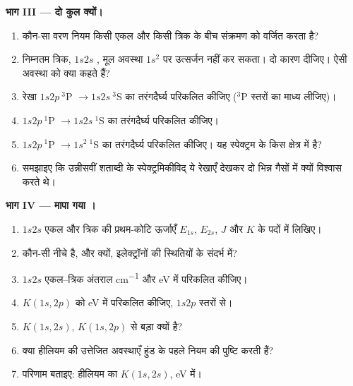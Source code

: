 \begin{problem}
\medskip\noindent\textbf{भाग III --- दो कुल क्यों।}
\begin{enumerate}[resume]
  \item कौन-सा वरण नियम किसी एकल और किसी
        त्रिक के बीच संक्रमण को वर्जित करता है?
  \item निम्नतम त्रिक, $1s2s$ , मूल
        अवस्था $1s^2$  पर उत्सर्जन नहीं कर सकता। दो कारण दीजिए। ऐसी अवस्था
        को क्या कहते हैं?
  \item रेखा $1s2p\ {}^3$P $\to 1s2s\ {}^3$S का तरंगदैर्घ्य परिकलित कीजिए
        (${}^3$P स्तरों का माध्य लीजिए)।
  \item $1s2p\ {}^1$P $\to 1s2s\ {}^1$S का तरंगदैर्घ्य परिकलित कीजिए।
  \item $1s2p\ {}^1$P $\to 1s^2\ {}^1$S का तरंगदैर्घ्य परिकलित कीजिए। यह स्पेक्ट्रम के
        किस क्षेत्र में है?
  \item समझाइए कि उन्नीसवीं शताब्दी के स्पेक्ट्रमिकीविद् ये रेखाएँ देखकर
        दो भिन्न गैसों में क्यों विश्वास करते थे।
\end{enumerate}

\medskip\noindent\textbf{भाग IV --- मापा गया ।}
\begin{enumerate}[resume]
  \item $1s2s$ एकल और त्रिक की प्रथम-कोटि ऊर्जाएँ
        $E_{1s}$, $E_{2s}$, $J$ और $K$ के पदों में लिखिए।
  \item कौन-सी नीचे है, और क्यों, इलेक्ट्रॉनों की स्थितियों के संदर्भ में?
  \item $1s2s$ एकल--त्रिक अंतराल \unit{cm^{-1}} और eV में परिकलित कीजिए।
  \item $K(1s,2p)$ को eV में परिकलित कीजिए, $1s2p$ स्तरों से।
  \item $K(1s,2s)$, $K(1s,2p)$ से बड़ा क्यों है?
  \item क्या हीलियम की उत्तेजित अवस्थाएँ हुंड के पहले नियम की पुष्टि करती हैं?
  \item परिणाम बताइए: हीलियम का  $K(1s,2s)$,
        eV में।
\end{enumerate}
\end{problem}

